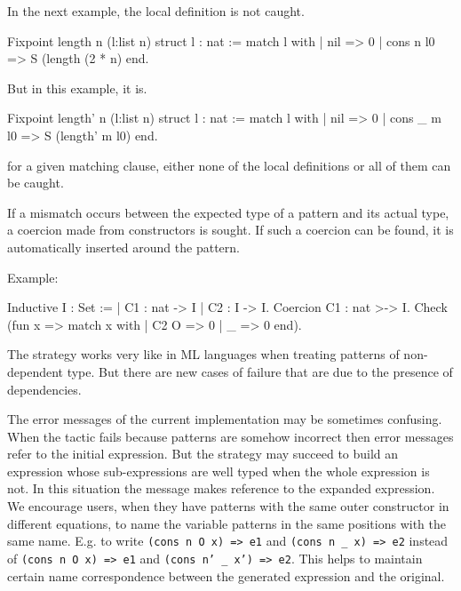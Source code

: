 In the next example, the local definition is not caught.

\begin{coq_example}
Fixpoint length n (l:list n) {struct l} : nat :=
  match l with
  | nil => 0%
  | cons n l0 => S (length (2 * n)%
  end.
\end{coq_example}

But in this example, it is.

\begin{coq_example}
Fixpoint length' n (l:list n) {struct l} : nat :=
  match l with
  | nil => 0%
  | cons _ m l0 => S (length' m l0)
  end.
\end{coq_example}

\Rem for a given matching clause, either none of the local
definitions or all of them can be caught.


If a mismatch occurs between the expected type of a pattern and its
actual type, a coercion made from constructors is sought. If such a
coercion can be found, it is automatically inserted around the
pattern.

Example:

\begin{coq_example}
Inductive I : Set :=
  | C1 : nat -> I
  | C2 : I -> I.
Coercion C1 : nat >-> I.
Check (fun x => match x with
                | C2 O => 0%
                | _ => 0%
                end).
\end{coq_example}


\label{limitations}
The strategy works very like in ML languages when treating
patterns of non-dependent type.  
But there are new cases of failure that are due to the presence of 
dependencies. 

The error messages of the current implementation may be sometimes
confusing.  When the tactic fails because patterns are somehow
incorrect then error messages refer to the initial expression. But the
strategy may succeed to build an expression whose sub-expressions are
well typed when the whole expression is not. In this situation the
message makes reference to the expanded expression.  We encourage
users, when they have patterns with the same outer constructor in
different equations, to name the variable patterns in the same
positions with the same name.  
E.g. to write {\small\texttt{(cons n O x) => e1}} 
and {\small\texttt{(cons n \_ x) => e2}} instead of
{\small\texttt{(cons n O x) => e1}} and 
{\small\texttt{(cons n' \_ x') => e2}}. 
This helps to maintain certain name correspondence between the
generated expression and the original.

